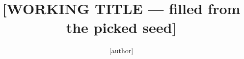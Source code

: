 \documentclass[aip,jcp,preprint]{revtex4-2}
\begin{document}
\title{[WORKING TITLE — filled from the picked seed]}
\author{[author]}

\maketitle







\end{document}
